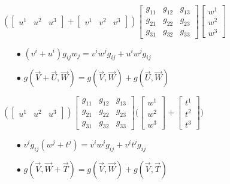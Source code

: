 \documentclass{article}
\begin{document}
\begin{itemize}
	$(\begin{bmatrix}
		u^{1} & u^{2} & u^{3}
	\end{bmatrix} + \begin{bmatrix}
		v^{1} & v^{2} & v^{3}
	\end{bmatrix})\begin{bmatrix}
		g_{11} & g_{12} & g_{13}\\
		g_{21} & g_{22} & g_{23}\\
		g_{31} & g_{32} & g_{33} 
	\end{bmatrix}\begin{bmatrix}
		w^{1}\\
		w^{2}\\
		w^{3}
	\end{bmatrix}$
		\begin{itemize}
			\item[$\bullet$] $(v^{i} + u^{i})g_{ij}w_{j} = v^{i}w^{j}g_{ij} + u^{i}w^{j}g_{ij}$
			\item[$\bullet$] $g(\overrightarrow{V} + \overrightarrow{U}, \overrightarrow{W}) = g(\overrightarrow{V}, \overrightarrow{W}) + g(\overrightarrow{U}, \overrightarrow{W})$
		\end{itemize}
	$(\begin{bmatrix}
		u^{1} & u^{2} & u^{3}
	\end{bmatrix})\begin{bmatrix}
		g_{11} & g_{12} & g_{13}\\
		g_{21} & g_{22} & g_{23}\\
		g_{31} & g_{32} & g_{33} 
	\end{bmatrix}\Bigg(\begin{bmatrix}
		w^{1}\\
		w^{2}\\
		w^{3}
	\end{bmatrix} + \begin{bmatrix}
	t^{1}\\
	t^{2}\\
	t^{3}
\end{bmatrix}\Bigg)$
	\begin{itemize}
		\item[$\bullet$] $v^{i}g_{ij}(w^{j} + t^{j}) = v^{i}w^{j}g_{ij} + v^{i}t^{j}g_{ij}$
		\item[$\bullet$] $g(\overrightarrow{V}, \overrightarrow{W}+\overrightarrow{T}) = g(\overrightarrow{V}, \overrightarrow{W}) + g(\overrightarrow{V}, \overrightarrow{T})$
	\end{itemize}
	
	\end{itemize}
\end{document}
